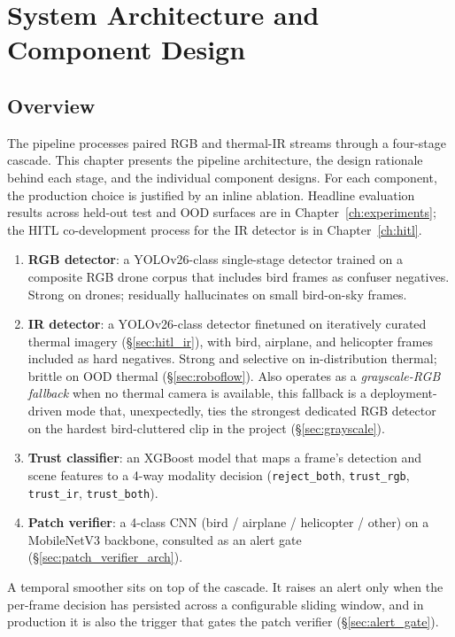 \documentclass[12pt,a4paper,oneside,openright]{book}
\begin{document}
\chapter{System Architecture and Component Design}
\label{ch:architecture}

\section{Overview}

The pipeline processes paired RGB and thermal-IR streams through a four-stage cascade. This chapter presents the pipeline architecture, the design rationale behind each stage, and the individual component designs. For each component, the production choice is justified by an inline ablation. Headline evaluation results across held-out test and OOD surfaces are in Chapter~\ref{ch:experiments}; the HITL co-development process for the IR detector is in Chapter~\ref{ch:hitl}.

\begin{enumerate}
    \item \textbf{RGB detector}: a YOLOv26-class single-stage detector trained on a composite RGB drone corpus that includes bird frames as confuser negatives. Strong on drones; residually hallucinates on small bird-on-sky frames.
    \item \textbf{IR detector}: a YOLOv26-class detector finetuned on iteratively curated thermal imagery (\S\ref{sec:hitl_ir}), with bird, airplane, and helicopter frames included as hard negatives. Strong and selective on in-distribution thermal; brittle on OOD thermal (\S\ref{sec:roboflow}). Also operates as a \emph{grayscale-RGB fallback} when no thermal camera is available, this fallback is a deployment-driven mode that, unexpectedly, ties the strongest dedicated RGB detector on the hardest bird-cluttered clip in the project (\S\ref{sec:grayscale}).
    \item \textbf{Trust classifier}: an XGBoost model that maps a frame's detection and scene features to a 4-way modality decision (\texttt{reject\_both}, \texttt{trust\_rgb}, \texttt{trust\_ir}, \texttt{trust\_both}).
    \item \textbf{Patch verifier}: a 4-class CNN (bird / airplane / helicopter / other) on a MobileNetV3 backbone, consulted as an alert gate (\S\ref{sec:patch_verifier_arch}).
\end{enumerate}

A temporal smoother sits on top of the cascade. It raises an alert only when the per-frame decision has persisted across a configurable sliding window, and in production it is also the trigger that gates the patch verifier (\S\ref{sec:alert_gate}).
\end{document}
